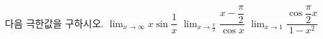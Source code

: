 다음 극한값을 구하시오.
 $\displaystyle\lim_{x\to\infty}x\sin\dfrac{1}{x}$
 $\displaystyle\lim_{x\to\frac{\pi}{2}}\dfrac{x-\dfrac{\pi}{2}}{\cos x}$
 $\displaystyle\lim_{x\to 1}\dfrac{\cos\dfrac{\pi}{2}x}{1-x^2}$
